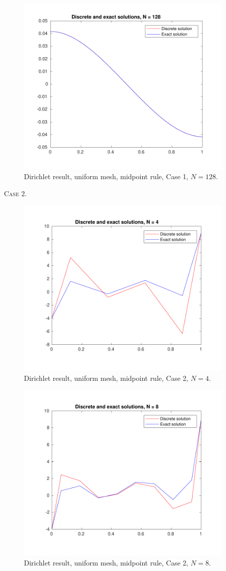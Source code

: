 \documentclass[a4paper]{article}
\numberwithin{equation}{section}
\begin{document}
\begin{figure}[H]
\centering\includegraphics[width=10.5cm]{fig_dirichlet_result_uniform_midpoint_N128_C1}
\caption{Dirichlet result, uniform mesh, midpoint rule, Case 1, $N=128$.}
\end{figure}
\newpage
 \textsc{Case 2.}
\begin{figure}[H]
\centering\includegraphics[width=10.5cm]{fig_dirichlet_result_uniform_midpoint_N4_C2}
\caption{Dirichlet result, uniform mesh, midpoint rule, Case 2, $N=4$.}
\end{figure}
\begin{figure}[H]
\centering\includegraphics[width=10.5cm]{fig_dirichlet_result_uniform_midpoint_N8_C2}
\caption{Dirichlet result, uniform mesh, midpoint rule, Case 2, $N=8$.}
\end{figure}
\end{document}
